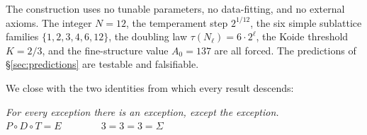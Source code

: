 \documentclass[11pt,a4paper]{article}
\theoremstyle{definition}
\theoremstyle{remark}
\begin{document}
The construction uses no tunable parameters, no data-fitting, and no external axioms. The integer $N=12$, the temperament step $2^{1/12}$, the six simple sublattice families $\{1,2,3,4,6,12\}$, the doubling law $\tau(N_{\ell})=6\cdot 2^{\ell}$, the Koide threshold $K=2/3$, and the fine-structure value $A_{0}=137$ are all forced. The predictions of \S\ref{sec:predictions} are testable and falsifiable.

We close with the two identities from which every result descends:

\begin{center}
\emph{For every exception there is an exception, except the exception.}\\[4pt]
$P \circ D \circ T = E \qquad\qquad 3 = 3 = 3 = \Sigma$
\end{center}
\end{document}
